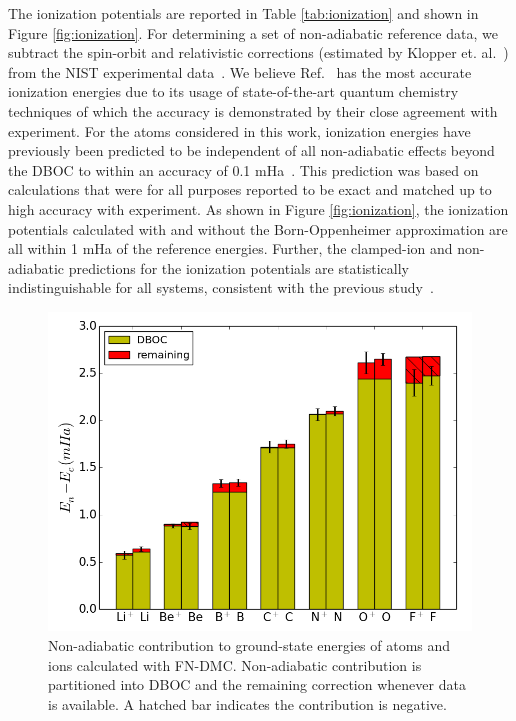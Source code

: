 \documentclass[pra,superscriptaddress,groupedaddress,twocolumn]{revtex4-1}
\begin{document}
The ionization potentials are reported in Table \ref{tab:ionization} and shown in Figure \ref{fig:ionization}. For determining a set of non-adiabatic reference data, we subtract the spin-orbit and relativistic corrections (estimated by Klopper et. al.~\cite{Klopper_IP}) from the NIST experimental data~\cite{NIST_Atoms}. We believe Ref.~\cite{Klopper_IP} has the most accurate ionization energies due to its usage of state-of-the-art quantum chemistry techniques of which the accuracy is demonstrated by their close agreement with experiment.
For the atoms considered in this work, ionization energies have previously been predicted to be independent of all non-adiabatic effects beyond the DBOC to within an accuracy of 0.1 mHa~\cite{Klopper_IP}. This prediction was based on calculations that were for all purposes reported to be exact and matched up to high accuracy with experiment. As shown in Figure \ref{fig:ionization}, the ionization potentials calculated with and without the Born-Oppenheimer approximation are all within 1 mHa of the reference energies. Further, the clamped-ion and non-adiabatic predictions for the ionization potentials are statistically indistinguishable for all systems, consistent with the previous study~\cite{Klopper_IP}.

\begin{figure}[h]
\includegraphics[scale=.37]{Figures/atom-nad-ad}
\caption{Non-adiabatic contribution to ground-state energies of atoms and ions calculated with FN-DMC. Non-adiabatic contribution is partitioned into DBOC and the remaining correction whenever data is available. A hatched bar indicates the contribution is negative. \label{fig:atom-nad-ad}} %
\end{figure}
\end{document}
